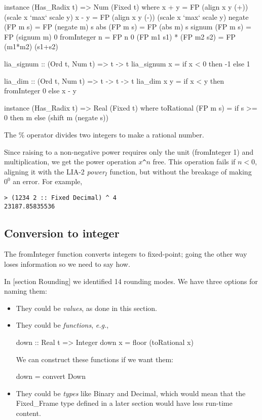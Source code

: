 \documentclass{article}
\begin{document}
\begin{code}
instance (Has_Radix t) => Num (Fixed t)
  where
    x + y = FP (align x y (+)) (scale x `max` scale y)
    x - y = FP (align x y (-)) (scale x `max` scale y)
    negate (FP m s) = FP (negate m) s
    abs    (FP m s) = FP (abs    m) s
    signum (FP m s) = FP (signum m) 0
    fromInteger n   = FP n 0
    (FP m1 s1) * (FP m2 s2)  = FP (m1*m2) (s1+s2)

lia_signum :: (Ord t, Num t) => t -> t
lia_signum x = if x < 0 then -1 else 1

lia_dim :: (Ord t, Num t) => t -> t -> t
lia_dim x y = if x < y then fromInteger 0 else x - y

instance (Has_Radix t) => Real (Fixed t)
  where
    toRational (FP m s) =
      if s >= 0 then m %
      else (shift m (negate s)) %
\end{code}
The \% operator divides two integers to make a rational number.

Since raising to a non-negative power requires only the unit
(fromInteger 1) and multiplication, we get the power operation
$x$\verb|^|$n$ free.  This operation fails if $n<0$, aligning
it with the LIA-2 {\it power${}_I$} function, but without the
breakage of making $0^0$ an error.  For example,
\begin{verbatim}
> (1234 2 :: Fixed Decimal) ^ 4
23187.85835536
\end{verbatim}

\subsection{Conversion to integer}

The fromInteger function converts integers to fixed-point;
going the other way loses information so we need to say how.

In [section Rounding] we identified 14 rounding modes.
We have three options for naming them:
\begin{itemize}
\item They could be {\it values}, as done in this section.
\item They could be {\it functions}, {\it e.g.},
\begin{code}%
down :: Real t => Integer
down x = floor (toRational x)
\end{code}
We can construct these functions if we want them:
\begin{code}%
down = convert Down
\end{code}
\item They could be {\it types} like Binary and Decimal,
which would mean that the Fixed\_Frame type defined in a
later section would have less run-time content.
\end{itemize}
\end{document}
